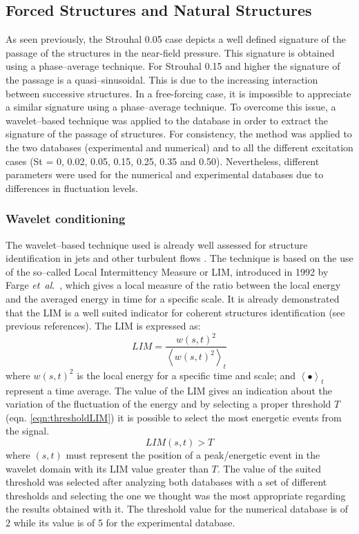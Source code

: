 \documentclass[english]{aiaa-tc}
\newcommand*{\etal}{\textit{et~al}.\ }
\begin{document}
\subsection{Forced Structures and Natural Structures}%
As seen previously, the Strouhal 0.05 case depicts a well defined signature of the passage of the structures in the near-field pressure. This signature is obtained using a phase--average technique. For Strouhal 0.15 and higher the signature of the passage is a quasi--sinusoidal. This is due to the increasing interaction between successive structures. In a free-forcing case, it is impossible to appreciate a similar signature using a phase--average technique. To overcome this issue, a wavelet--based technique was applied to the database in order to extract the signature of the passage of structures. For consistency, the method was applied to the two databases (experimental and numerical) and to all the different excitation cases (St = 0, 0.02, 0.05, 0.15, 0.25, 0.35 and 0.50). Nevertheless, different parameters were used for the numerical and experimental databases due to differences in fluctuation levels.

\subsubsection{Wavelet conditioning}
The wavelet--based technique used is already well assessed for structure identification in jets and other turbulent flows \cite{Camussi1997,Camussi1997b,Guj1999,Camussi2002,Guj2003}.
The technique is based on the use of the so--called Local Intermittency Measure or LIM, introduced in 1992 by Farge \etal \cite{Farge1992}, which gives a local measure of the ratio between the local energy and the averaged energy in time for a specific scale.
It is already demonstrated that the LIM is a well suited indicator for coherent structures identification (see previous references).
The LIM is expressed as:
\begin{equation}
	\label{eqn:LIM}
	LIM = \frac{w(s, t)^{2}}{\left<w(s, t)^{2}\right>_{t}}
\end{equation}
where $w(s, t)^{2}$ is the local energy for a specific time and scale; and $\left< \bullet \right>_{t}$ represent a time average.
The value of the LIM gives an indication about the variation of the fluctuation of the energy and by selecting a proper threshold $T$  (eqn. \ref{eqn:thresholdLIM}) it is possible to select the most energetic events from the signal.
\begin{equation} \label{eqn:thresholdLIM}
	LIM(s, t) > T
\end{equation}
where $(s, t)$ must represent the position of a peak/energetic event in the wavelet domain with its LIM value greater than $T$.
The value of the suited threshold was selected after analyzing both databases with a set of different thresholds and selecting the one we thought was the most appropriate regarding the results obtained with it.
The threshold value for the numerical database is of 2 while its value is of 5 for the experimental database.
\end{document}
